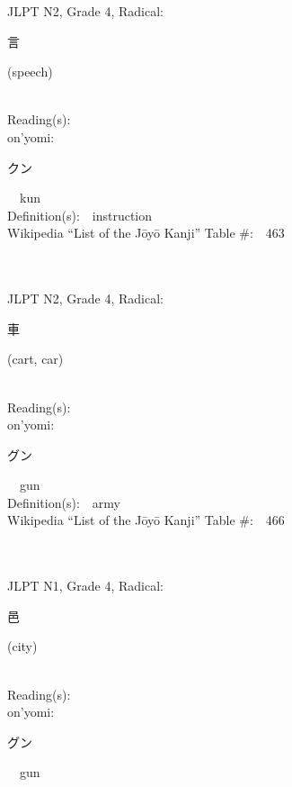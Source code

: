 \begin{multicols}{2}
{JLPT N2, Grade 4, Radical:\ \ {\begin{CJK}{UTF8}{min} 言 \end{CJK}} (speech) } \\
Reading(s):\ \ \\
{\hspace*{1em}}on'yomi:\ \ \\
{\hspace*{2em}}{\begin{CJK}{UTF8}{min} クン \end{CJK}}\ \ kun\ \ \\
Definition(s):\ \ instruction \\
Wikipedia ``List of the J\=oy\=o Kanji'' Table \#:\ \ 463 \\
\ \ \\
{\fontsize{34pt}{40pt}  }\ \ \\  %
{JLPT N2, Grade 4, Radical:\ \ {\begin{CJK}{UTF8}{min} 車 \end{CJK}} (cart, car) } \\
Reading(s):\ \ \\
{\hspace*{1em}}on'yomi:\ \ \\
{\hspace*{2em}}{\begin{CJK}{UTF8}{min} グン \end{CJK}}\ \ gun\ \ \\
Definition(s):\ \ army \\
Wikipedia ``List of the J\=oy\=o Kanji'' Table \#:\ \ 466 \\
\ \ \\
{\fontsize{34pt}{40pt}  }\ \ \\  %
{JLPT N1, Grade 4, Radical:\ \ {\begin{CJK}{UTF8}{min} 邑 \end{CJK}} (city) } \\
Reading(s):\ \ \\
{\hspace*{1em}}on'yomi:\ \ \\
{\hspace*{2em}}{\begin{CJK}{UTF8}{min} グン \end{CJK}}\ \ gun\ \ \\

\end{multicols}
